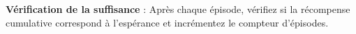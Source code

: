 \textbf{Vérification de la suffisance} :
Après chaque épisode, vérifiez si la récompense cumulative correspond à l'espérance et incrémentez le compteur d'épisodes.





\

